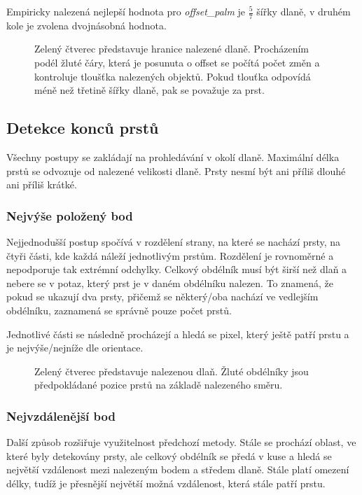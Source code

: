 Empiricky nalezená nejlepší hodnota pro \textit{offset\_palm} je $ \frac{5}{7} $ šířky dlaně, v druhém kole je zvolena dvojnásobná hodnota. 

\begin{figure}[htp]
\centering
{}
\caption{Zelený čtverec představuje hranice nalezené dlaně. Procházením podél žluté čáry, která je posunuta o offset se počítá počet změn a kontroluje tloušťka nalezených objektů. Pokud tlouťka odpovídá méně než třetině šířky dlaně, pak se považuje za prst.}
\label{pic19}
\end{figure}
\newpage
\subsection{Detekce konců prstů}
Všechny postupy se zakládají na prohledávání v okolí dlaně. Maximální délka prstů se odvozuje od nalezené velikosti dlaně. Prsty nesmí být ani příliš dlouhé ani příliš krátké.\\

\subsubsection{Nejvýše položený bod}
Nejjednodušší postup spočívá v rozdělení strany, na které se nachází prsty, na čtyři části, kde každá náleží jednotlivým prstům. Rozdělení je rovnoměrné a nepodporuje tak extrémní odchylky. Celkový obdélník musí být širší než dlaň a nebere se v potaz, který prst je v daném obdélníku nalezen. To znamená, že pokud se ukazují dva prsty, přičemž se některý/oba nachází ve vedlejším obdélníku, zaznamená se správně pouze počet prstů.

Jednotlivé části se následně procházejí a hledá se pixel, který ještě patří prstu a je nejvýše/nejníže dle orientace.\\

\begin{figure}[htp]
\centering
{}
\caption{Zelený čtverec představuje nalezenou dlaň. Žluté obdélníky jsou předpokládané pozice prstů na základě nalezeného směru.}
\label{pic20}
\end{figure}

\subsubsection{Nejvzdálenější bod}
Další způsob rozšiřuje využitelnost předchozí metody. Stále se prochází oblast, ve které byly detekovány prsty, ale celkový obdélník se předá v kuse a hledá se největší vzdálenost mezi nalezeným bodem a středem dlaně. Stále platí omezení délky, tudíž je přesnější největší možná vzdálenost, která stále patří prstu.

